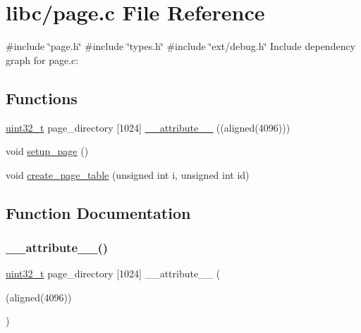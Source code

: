 \hypertarget{a00044}{}\section{libc/page.c File Reference}
\label{a00044}
{\ttfamily \#include \char`\"{}page.\+h\char`\"{}}\newline
{\ttfamily \#include \char`\"{}types.\+h\char`\"{}}\newline
{\ttfamily \#include \char`\"{}ext/debug.\+h\char`\"{}}\newline
Include dependency graph for page.\+c\+:
\subsection*{Functions}
\begin{DoxyCompactItemize}
\item 
\hyperlink{a00068_a435d1572bf3f880d55459d9805097f62_a435d1572bf3f880d55459d9805097f62}{uint32\+\_\+t} page\+\_\+directory \mbox{[}1024\mbox{]} \hyperlink{a00044_a37f8e955bf961194d85eb31c4083e0ba_a37f8e955bf961194d85eb31c4083e0ba}{\+\_\+\+\_\+attribute\+\_\+\+\_\+} ((aligned(4096)))
\item 
void \hyperlink{a00044_a51f6a37816540dea572d38f2713e9f5a_a51f6a37816540dea572d38f2713e9f5a}{setup\+\_\+page} ()
\item 
void \hyperlink{a00044_a7bb2c9b4c69002e17903710ce4de395c_a7bb2c9b4c69002e17903710ce4de395c}{create\+\_\+page\+\_\+table} (unsigned int i, unsigned int id)
\end{DoxyCompactItemize}


\subsection{Function Documentation}
\mbox{\label{a00044_a37f8e955bf961194d85eb31c4083e0ba_a37f8e955bf961194d85eb31c4083e0ba}} 
\subsubsection{\texorpdfstring{\+\_\+\+\_\+attribute\+\_\+\+\_\+()}{\_\_attribute\_\_()}}
{\footnotesize\ttfamily \hyperlink{a00068_a435d1572bf3f880d55459d9805097f62_a435d1572bf3f880d55459d9805097f62}{uint32\+\_\+t} page\+\_\+directory \mbox{[}1024\mbox{]} \+\_\+\+\_\+attribute\+\_\+\+\_\+ (\begin{DoxyParamCaption}\item[{(aligned(4096))}]{ }\end{DoxyParamCaption})}

